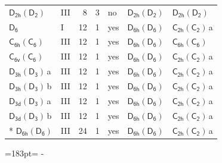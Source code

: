 \documentclass[10pt,a4paper]{article}
\newcommand{\needspace}[1]{\par\penalty-100\begingroup\dimen0=#1\relax\dimen2=\pagegoal
  \advance\dimen2-\pagetotal\ifdim\dimen0>\dimen2\relax\ifdim\dimen2>0pt\vfil\break\fi\fi
  \endgroup}
\numberwithin{equation}{section}
\newcommand{\grp}[1]{\mathsf{#1}}
\newcommand{\clsletter}[1]{\,{\scriptsize\color{black!55}#1}}
\begin{document}
{\begin{longtable}{@{}llrrlll@{}}
\href{D2h-D2.pdf}{$\grp{D_{2h}}(\grp{D_{2}})$} & III & 8 & 3 & no & \href{D2h-D2.pdf}{$\grp{D_{2h}}(\grp{D_{2}})$} & \href{D2h-D2.pdf}{$\grp{D_{2h}}(\grp{D_{2}})$}\\
\href{../../../rotation/data/pdf/D6.pdf}{$\grp{D_{6}}$} & I & 12 & 1 & yes & \href{D6h-D6.pdf}{$\grp{D_{6h}}(\grp{D_{6}})$} & \href{C2h-C2.pdf}{$\grp{C_{2h}}(\grp{C_{2}})$}\clsletter{a}\\
\href{C6h-C6.pdf}{$\grp{C_{6h}}(\grp{C_{6}})$} & III & 12 & 1 & yes & \href{D6h-D6.pdf}{$\grp{D_{6h}}(\grp{D_{6}})$} & \href{C6h-C6.pdf}{$\grp{C_{6h}}(\grp{C_{6}})$}\\
\href{C6v-C6.pdf}{$\grp{C_{6v}}(\grp{C_{6}})$} & III & 12 & 1 & yes & \href{D6h-D6.pdf}{$\grp{D_{6h}}(\grp{D_{6}})$} & \href{C2h-C2.pdf}{$\grp{C_{2h}}(\grp{C_{2}})$}\clsletter{a}\\
\href{D3h-D3.pdf}{$\grp{D_{3h}}(\grp{D_{3}})$}\clsletter{a} & III & 12 & 1 & yes & \href{D6h-D6.pdf}{$\grp{D_{6h}}(\grp{D_{6}})$} & \href{C2h-C2.pdf}{$\grp{C_{2h}}(\grp{C_{2}})$}\clsletter{a}\\
\href{D3h-D3.pdf}{$\grp{D_{3h}}(\grp{D_{3}})$}\clsletter{b} & III & 12 & 1 & yes & \href{D6h-D6.pdf}{$\grp{D_{6h}}(\grp{D_{6}})$} & \href{C2h-C2.pdf}{$\grp{C_{2h}}(\grp{C_{2}})$}\clsletter{a}\\
\href{D3d-D3.pdf}{$\grp{D_{3d}}(\grp{D_{3}})$}\clsletter{a} & III & 12 & 1 & yes & \href{D6h-D6.pdf}{$\grp{D_{6h}}(\grp{D_{6}})$} & \href{C2h-C2.pdf}{$\grp{C_{2h}}(\grp{C_{2}})$}\clsletter{a}\\
\href{D3d-D3.pdf}{$\grp{D_{3d}}(\grp{D_{3}})$}\clsletter{b} & III & 12 & 1 & yes & \href{D6h-D6.pdf}{$\grp{D_{6h}}(\grp{D_{6}})$} & \href{C2h-C2.pdf}{$\grp{C_{2h}}(\grp{C_{2}})$}\clsletter{a}\\*
\href{D6h-D6.pdf}{$\grp{D_{6h}}(\grp{D_{6}})$} & III & 24 & 1 & yes & \href{D6h-D6.pdf}{$\grp{D_{6h}}(\grp{D_{6}})$} & \href{C2h-C2.pdf}{$\grp{C_{2h}}(\grp{C_{2}})$}\clsletter{a}\\
\bottomrule\end{longtable}}
\needspace{183pt}
\end{document}
